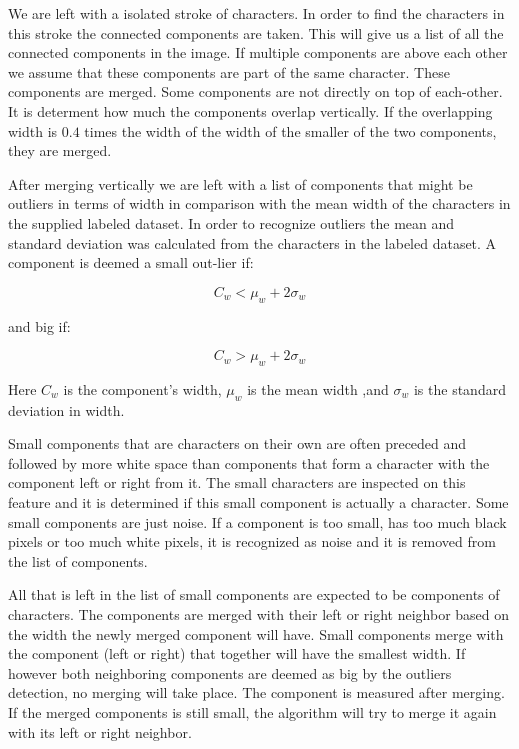 

We are left with a isolated stroke of characters. In order to find the characters in this stroke the connected components are taken. This will give us a list of all the connected components in the image. If multiple components are above each other we assume that these components are part of the same character. These components are merged. Some components are not directly on top of each-other. It is determent how much the components overlap vertically. If the overlapping width is $0.4$ times the width of the width of the smaller of the two components, they are merged. 

After merging vertically we are left with a list of components that might be outliers in terms of width in comparison with the mean width of the characters in the supplied labeled dataset. In order to recognize outliers the mean and standard deviation was calculated from the characters in the labeled dataset. A component is deemed a small out-lier if:

\begin{equation}
C_w < \mu_w + 2 \sigma_w 
\end{equation}

and big if:

\begin{equation}
C_w > \mu_w + 2 \sigma_w 
\end{equation}

Here $C_w$ is the component's width, $\mu_w$ is the mean width ,and $\sigma_w$ is the standard deviation in width.


Small components that are characters on their own are often preceded and followed by more white space than components that form a character with the component left or right from it. The small characters are inspected on this feature and it is determined if this small component is actually a character. Some small components are just noise. If a component is too small, has too much black pixels or too much white pixels, it is recognized as noise and it is removed from the list of components. 


All that is left in the list of small components are expected to be components of characters. The components are merged with their left or right neighbor based on the width the newly merged component will have. Small components merge with the component (left or right) that together will have the smallest width. If however both neighboring components are deemed as big by the outliers detection, no merging will take place. The component is measured after merging. If the merged components is still small, the algorithm will try to merge it again with its left or right neighbor.

